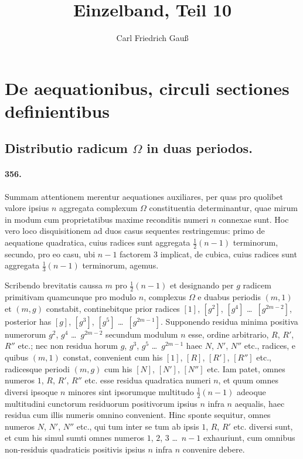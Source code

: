 \documentclass[12pt,a4paper]{article}
\title{Einzelband, Teil 10}
\author{Carl Friedrich Gau\ss}
\date{}
\theoremstyle{plain}
\theoremstyle{definition}
\theoremstyle{remark}
\begin{document}
\maketitle

\section*{De aequationibus, circuli sectiones definientibus}

\noindent

\subsection*{Distributio radicum $\Omega$ in duas periodos.}

\paragraph{356.}
Summam attentionem merentur aequationes auxiliares, per quas pro quolibet
valore ipsius $n$ aggregata complexum $\Omega$ constituentia determinantur, quae
mirum in modum cum proprietatibus maxime reconditis numeri $n$ connexae sunt.
Hoc vero loco disquisitionem ad duos casus sequentes restringemus: primo de
aequatione quadratica, cuius radices sunt aggregata $\frac{1}{2}(n-1)$ terminorum,
secundo, pro eo casu, ubi $n-1$ factorem $3$ implicat, de cubica, cuius radices
sunt aggregata $\frac{1}{3}(n-1)$ terminorum, agemus.

Scribendo brevitatis caussa $m$ pro $\frac{1}{2}(n-1)$ et designando per $g$
radicem primitivam quamcunque pro modulo $n$, complexus $\Omega$ e duabus
periodis $(m,1)$ et $(m,g)$ constabit, continebitque prior radices
$[1]$, $[g^2]$, $[g^4]$ \ldots\ $[g^{2m-2}]$, posterior has
$[g]$, $[g^3]$, $[g^5]$ \ldots\ $[g^{2m-1}]$. Supponendo residua minima
positiva numerorum $g^2$, $g^4$ \ldots\ $g^{2m-2}$ secundum modulum $n$ esse,
ordine arbitrario, $R$, $R'$, $R''$ etc.; nec non residua horum $g$, $g^3$,
$g^5$ \ldots\ $g^{2m-1}$ haec $N$, $N'$, $N''$ etc., radices, e quibus
$(m,1)$ constat, convenient cum his $[1]$, $[R]$, $[R']$, $[R'']$ etc.,
radicesque periodi $(m,g)$ cum his $[N]$, $[N']$, $[N'']$ etc. Iam patet,
omnes numeros $1$, $R$, $R'$, $R''$ etc. esse residua quadratica numeri $n$,
et quum omnes diversi ipsoque $n$ minores sint ipsorumque multitudo
$\frac{1}{2}(n-1)$ adeoque multitudini cunctorum residuorum positivorum ipsius
$n$ infra $n$ aequalis, haec residua cum illis numeris omnino convenient.
Hinc sponte sequitur, omnes numeros $N$, $N'$, $N''$ etc., qui tum inter se
tum ab ipsis $1$, $R$, $R'$ etc. diversi sunt, et cum his simul sumti omnes
numeros $1$, $2$, $3$ \ldots\ $n-1$ exhauriunt, cum omnibus non-residuis
quadraticis positivis ipsius $n$ infra $n$ convenire debere.
\end{document}
